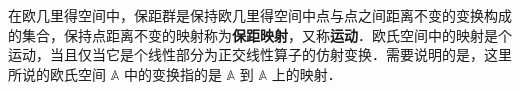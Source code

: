 
在欧几里得空间中，保距群是保持欧几里得空间中点与点之间距离不变的变换构成的集合，保持点距离不变的映射称为\textbf{保距映射}，又称\textbf{运动}．欧氏空间中的映射是个运动，当且仅当它是个线性部分为正交线性算子的仿射变换．需要说明的是，这里所说的欧氏空间 $\mathbb A$ 中的变换指的是 $\mathbb A$ 到 $\mathbb A$ 上的映射．
